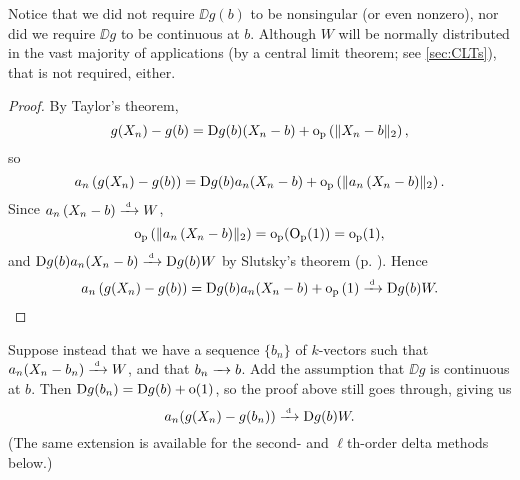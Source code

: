 \documentclass[11pt,letterpaper,reqno,oneside]{article}
\begin{document}
\begin{remark}
	Notice that we did not require $\DD g(b)$ to be nonsingular (or even nonzero), nor did we require $\DD g$ to be continuous at $b$. Although $W$ will be normally distributed in the vast majority of applications (by a central limit theorem; see \cref{sec:CLTs}), that is not required, either.
\end{remark}


\begin{proof}
	By Taylor's theorem,
	\begin{equation*}
		g(X_n) - g(b) 
		= \mathrm{D} g(b) (X_n-b)
		+ \mathrm{o}_{\mathrm{p}}\left( \lVert X_n-b\rVert_2 \right) ,
	\end{equation*}
	so
	\begin{equation*}
		a_n \left( g(X_n) - g(b) \right)
		= \mathrm{D} g(b) a_n (X_n-b)
		+ \mathrm{o}_{\mathrm{p}}\left( \lVert a_n \left( X_n-b \right) \rVert_2 \right) .
	\end{equation*}
	Since $a_n \left( X_n-b \right) \xrightarrow{{\scriptscriptstyle \mathrm{\;d\;}}} W$,
	\begin{equation*}
		\mathrm{o}_{\mathrm{p}}\left( \lVert a_n \left( X_n-b \right) \rVert_2 \right) 
		= \mathrm{o}_{\mathrm{p}}( \mathrm{O}_{\mathrm{p}}(1) ) 
		= \mathrm{o}_{\mathrm{p}}(1) ,
	\end{equation*}
	and $\mathrm{D} g(b) a_n (X_n-b) \xrightarrow{{\scriptscriptstyle \mathrm{\;d\;}}} \mathrm{D} g(b) W$ by Slutsky's theorem (p. \pageref{corollary:Slutsky}). Hence
	\begin{equation*}
		a_n \left( g(X_n) - g(b) \right)
		= \mathrm{D} g(b) a_n (X_n-b)
		+ \mathrm{o}_{\mathrm{p}}\left( 1 \right)
		\xrightarrow{{\scriptscriptstyle \mathrm{\;d\;}}} \mathrm{D} g(b) W . \qedhere
	\end{equation*}
\end{proof}

\begin{remark}
	Suppose instead that we have a sequence $\{ b_n \}$ of $k$-vectors such that $a_n ( X_n - b_n ) \xrightarrow{{\scriptscriptstyle \mathrm{\;d\;}}} W$, and that $b_n \xrightarrow{\;\;\;} b$. Add the assumption that $\DD g$ is continuous at $b$. Then $\mathrm{D} g(b_n) = \mathrm{D} g(b) + \mathrm{o}(1)$, so the proof above still goes through, giving us
	\begin{equation*}
		a_n( g(X_n) - g(b_n) ) \xrightarrow{{\scriptscriptstyle \mathrm{\;d\;}}} \mathrm{D} g(b) W .
	\end{equation*}
	(The same extension is available for the second- and $\ell$th-order delta methods below.)
\end{remark}
\end{document}
